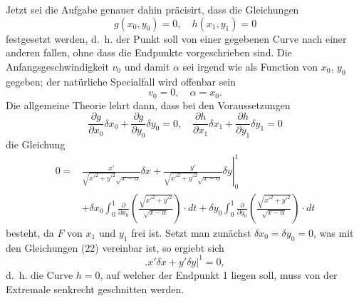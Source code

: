 \documentclass[11pt,a4paper,leqno]{article}
\begin{document}
Jetzt sei die Aufgabe genauer dahin präcisirt, dass die Gleichungen
\[
g(x_0,y_0)=0,\quad h(x_1,y_1)=0
\]
festgesetzt werden, d.~h. der Punkt soll von einer gegebenen Curve nach einer anderen fallen, ohne dass die Endpunkte vorgeschrieben sind. Die Anfangsgeschwindigkeit $v_0$ und damit $\alpha$ sei irgend wie als Function von $x_0$, $y_0$ gegeben; der natürliche Specialfall wird offenbar sein
\begin{equation}\tag{21}
v_0=0,\quad \alpha=x_0.
\end{equation}
Die allgemeine Theorie lehrt dann, dass bei den Voraussetzungen
\begin{equation}\tag{22}
\frac{\partial g}{\partial x_0}\delta x_0+\frac{\partial g}{\partial y_0}\delta y_0=0,
\quad
\frac{\partial h}{\partial x_1}\delta x_1+\frac{\partial h}{\partial y_1}\delta y_1=0
\end{equation}
die Gleichung
\begin{equation}\tag{23}
\begin{split}
0={}&\left.\frac{x'}{\sqrt{x'^2+y'^2}\sqrt{x-\alpha}}\delta x+\frac{y'}{\sqrt{x'^2+y'^2}\sqrt{x-\alpha}}\delta y\right|_0^1\\
&+\delta x_0\int_0^1\frac{\partial}{\partial x_0}\left(\frac{\sqrt{x'^2+y'^2}}{\sqrt{x-\alpha}}\right)\cdot dt
+\delta y_0\int_0^1\frac{\partial}{\partial y_0}\left(\frac{\sqrt{x'^2+y'^2}}{\sqrt{x-\alpha}}\right)\cdot dt
\end{split}
\end{equation}
besteht, da $F$ von $x_1$ und $y_1$ frei ist. Setzt man zunächst $\delta x_0=\delta y_0=0$, was mit den Gleichungen (22) vereinbar ist, so ergiebt sich
\[
\bigl. x'\delta x+y'\delta y\bigr|^1=0,
\]
d.~h. die Curve $h=0$, auf welcher der Endpunkt 1 liegen soll, muss von der Extremale senkrecht geschnitten werden.
\end{document}
